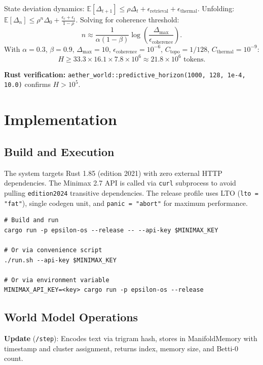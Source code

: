 \documentclass[11pt, a4paper]{article}
\theoremstyle{proofform}
\numberwithin{innerpoints}{subsection}
\numberwithin{disproof}{subsection}
\theoremstyle{mathproof}
\begin{document}
\begin{Proof}
State deviation dynamics: $\mathbb{E}[\Delta_{t+1}] \leq \rho \Delta_t + \epsilon_{\text{retrieval}} + \epsilon_{\text{thermal}}$. Unfolding: $\mathbb{E}[\Delta_n] \leq \rho^n \Delta_0 + \frac{\epsilon_r + \epsilon_t}{1 - \rho}$. Solving for coherence threshold:
\[
n \approx \frac{1}{\alpha(1-\beta)} \log\!\left(\frac{\Delta_{\max}}{\epsilon_{\text{coherence}}}\right).
\]
With $\alpha = 0.3$, $\beta = 0.9$, $\Delta_{\max} = 10$, $\epsilon_{\text{coherence}} = 10^{-6}$, $C_{\text{topo}} = 1/128$, $C_{\text{thermal}} = 10^{-9}$:
\[
H \geq 33.3 \times 16.1 \times 7.8 \times 10^6 \approx 21.8 \times 10^6 \text{ tokens}.
\]

\textbf{Rust verification:} \texttt{aether\_world::predictive\_horizon(1000, 128, 1e-4, 10.0)} confirms $H > 10^5$.
\end{Proof}

\section{Implementation}
\label{sec:implementation}

\subsection{Build and Execution}

The system targets Rust 1.85 (edition 2021) with zero external HTTP dependencies. The Minimax 2.7 API is called via \texttt{curl} subprocess to avoid pulling \texttt{edition2024} transitive dependencies. The release profile uses LTO (\texttt{lto = "fat"}), single codegen unit, and \texttt{panic = "abort"} for maximum performance.

\begin{lstlisting}[caption={Building and running}]
# Build and run
cargo run -p epsilon-os --release -- --api-key $MINIMAX_KEY

# Or via convenience script
./run.sh --api-key $MINIMAX_KEY

# Or via environment variable
MINIMAX_API_KEY=<key> cargo run -p epsilon-os --release
\end{lstlisting}

\subsection{World Model Operations}

\textbf{Update} (\texttt{/step}): Encodes text via trigram hash, stores in ManifoldMemory with timestamp and cluster assignment, returns index, memory size, and Betti-0 count.
\end{document}

